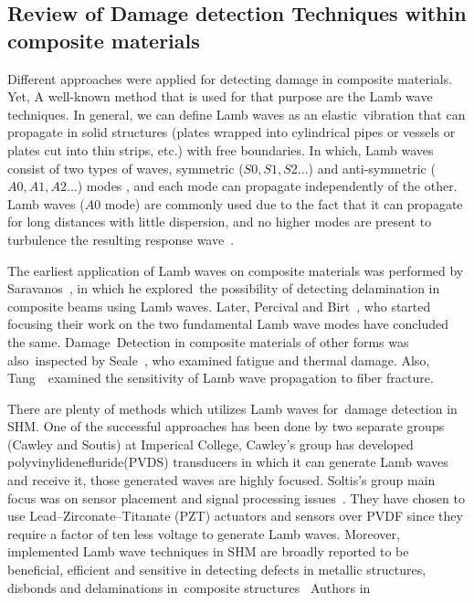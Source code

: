 \documentclass[preprint,9pt]{elsarticle}
\begin{document}
\subsection{Review of Damage detection Techniques within composite materials }	
Different approaches were applied for detecting damage in composite materials. Yet, A well-known method that is used for that purpose are the Lamb wave techniques. In general, we can define Lamb waves as an elastic vibration that can propagate in solid structures (plates wrapped into cylindrical pipes or vessels or plates cut into thin strips, etc.) with free boundaries. In which, Lamb waves consist of two types of waves, symmetric ($S0,S1,S2...$) and anti-symmetric ($A0,A1,A2...$) modes , and each mode can propagate independently of the other. Lamb waves ($A0$ mode) are commonly used due to the fact that it can propagate for long distances with little dispersion, and no higher modes are present to turbulence the resulting response wave~\cite{Valed2000}.
	
The earliest application of Lamb waves on composite materials was performed by Saravanos~\cite{doi:10.2514/6.1994-1754}, in which he explored the possibility of detecting delamination in composite beams using Lamb waves. Later, Percival and Birt~\cite{Percival1997}, who started focusing their work on the two fundamental Lamb wave modes have concluded the same. Damage Detection in composite materials of other forms was also inspected by Seale~\cite{Seale1998}, who examined fatigue and thermal damage. Also, Tang~\cite{Tang1989} examined the sensitivity of Lamb wave propagation to fiber fracture.

There are plenty of methods which utilizes Lamb waves for damage detection in SHM. One of the successful approaches has been done by two separate groups (Cawley and Soutis) at Imperical College, Cawley's group has developed polyvinylidenefluride(PVDS) transducers in which it can generate Lamb waves and receive it, those generated waves are highly focused. Soltis's group main focus was on sensor placement and signal processing issues~\cite{Valed2000,Valed2000a,Valed2001}. They have chosen to use Lead–Zirconate–Titanate (PZT) actuators and sensors over PVDF since they require a factor of ten less voltage to generate Lamb waves. Moreover, implemented Lamb wave techniques in SHM are broadly reported to be beneficial, efficient and sensitive in detecting defects in metallic structures, disbonds and delaminations in composite structures~\cite{Boller2000,Diamanti2004,Su2006,Raghavan2007,Diamanti2007} \newline Authors in~\cite{Ng2009} 
	
\end{document}
